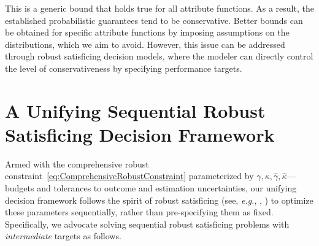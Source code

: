 \documentclass[opre, blindrev]{informs4}
\newcommand{\1}[1]{\mathds{1}{\left(#1\right)}}
\begin{document}
This is a generic bound that holds true for all attribute functions. As a result, the established probabilistic guarantees tend to be conservative. Better bounds can be obtained for specific attribute functions by imposing assumptions on the distributions, which we aim to avoid. However, this issue can be addressed through robust satisficing decision models, where the modeler can directly control the level of conservativeness by specifying performance targets.  

\section{A Unifying Sequential Robust Satisficing Decision Framework}
\label{sec:robust_satisficing_decision_framework}

Armed with the comprehensive robust constraint~\eqref{eq:ComprehensiveRobustConstraint} parameterized by $\gamma, \kappa, \hat \gamma, \hat \kappa$---budgets and tolerances to outcome and estimation uncertainties, our unifying decision framework follows the spirit of robust satisficing (see, \textit{e.g.}, \citealt{BenTal_et_al_2017globalized}, \citealt{Long_Sim_Zhou_2023robust}) to optimize these parameters sequentially, rather than pre-specifying them as fixed. Specifically, we advocate solving sequential robust satisficing problems with \textit{intermediate} targets as follows.
\end{document}
